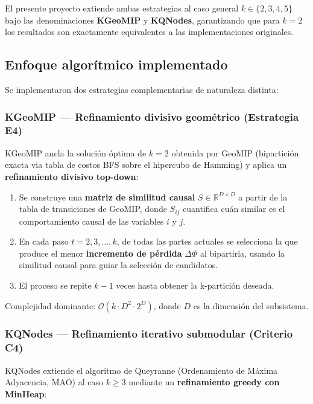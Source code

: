 \smallskip
El presente proyecto extiende ambas estrategias al caso general
$k \in \{2, 3, 4, 5\}$ bajo las denominaciones \textbf{KGeoMIP} y \textbf{KQNodes},
garantizando que para $k = 2$ los resultados son exactamente equivalentes a las implementaciones
originales.

\subsection{Enfoque algorítmico implementado}

Se implementaron dos estrategias complementarias de naturaleza distinta:

\subsubsection*{KGeoMIP — Refinamiento divisivo geométrico (Estrategia E4)}

KGeoMIP ancla la solución óptima de $k=2$ obtenida por GeoMIP (bipartición exacta via tabla de
costos BFS sobre el hipercubo de Hamming) y aplica un \textbf{refinamiento divisivo top-down}:

\begin{enumerate}
  \item Se construye una \textbf{matriz de similitud causal} $S \in \mathbb{R}^{D \times D}$
        a partir de la tabla de transiciones de GeoMIP, donde $S_{ij}$ cuantifica cuán
        similar es el comportamiento causal de las variables $i$ y $j$.
  \item En cada paso $t = 2, 3, \ldots, k$, de todas las partes actuales se selecciona
        la que produce el menor \textbf{incremento de pérdida} $\Delta\Phi$ al bipartirla,
        usando la similitud causal para guiar la selección de candidatos.
  \item El proceso se repite $k-1$ veces hasta obtener la k-partición deseada.
\end{enumerate}

Complejidad dominante: $\mathcal{O}(k \cdot D^2 \cdot 2^D)$, donde $D$ es la dimensión del
subsistema.

\subsubsection*{KQNodes — Refinamiento iterativo submodular (Criterio C4)}

KQNodes extiende el algoritmo de Queyranne (Ordenamiento de Máxima Adyacencia, MAO) al caso
$k \geq 3$ mediante un \textbf{refinamiento greedy con MinHeap}:

